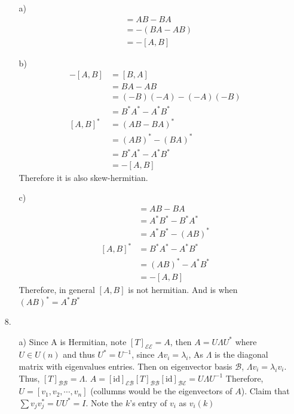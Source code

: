 \documentclass{article}
\begin{document}
\begin{itemize}
    \begin{itemize}
        \item [a)]
        \begin{align*}
            [B,A]&=AB-BA\\
            &=-(BA-AB)\\
            &=-[A,B]
        \end{align*}
        \item [b)]
        \begin{align*}
            -[A,B]&=[B,A]\\
            &=BA-AB\\
            &=(-B)(-A)-(-A)(-B)\\
            &=B^*A^*-A^*B^*\\
            [A,B]^*&=\left(AB-BA\right)^*\\
            &=(AB)^*-(BA)^*\\
            &=B^*A^*-A^*B^*\\
            &=-[A,B]
        \end{align*}
        Therefore it is also skew-hermitian.
        \item [c)]
        \begin{align*}
            [A,B]&=AB-BA\\
            &=A^*B^*-B^*A^*\\
            &=A^*B^*-(AB)^*\\
            [A,B]^*&=B^*A^*-A^*B^*\\
            &=(AB)^*-A^*B^*\\
            &=-[A,B]
        \end{align*}
        Therefore, in general \([A,B]\) is not hermitian. And is when \((AB)^*=A^*B^*\)
    \end{itemize}
    \item [8.]
    \begin{itemize}
        \item [a)] Since A is Hermitian, note \([T]_{\mathcal{EE}}=A\), then \(A=U\Lambda U^*\) where \(U\in U(n)\) and thus \(U^*=U^{-1}\), since \(Av_i = \lambda_i\), As \(\Lambda\) is the diagonal matrix with eigenvalues entries. Then on eigenvector basis \(\mathcal{B}\), \(\Lambda v_i=\lambda_iv_i\). Thus, \([T]_{\mathcal{BB}}=\Lambda\).
        \(A=[\text{id}]_{\mathcal{EB}}[T]_{\mathcal{BB}}[\text{id}]_{\mathcal{BE}}=U\Lambda U^{-1}\) Therefore, \(U=[v_1,v_2,\cdots,v_n]\) (collumns would be the eigenvectors of \(A\)). Claim that 
        \(\sum v_jv_j^*=UU^*=I\). Note the \(k\)'s entry of \(v_i\) as \(v_i(k)\)

\end{itemize}
\end{itemize}
\end{document}
